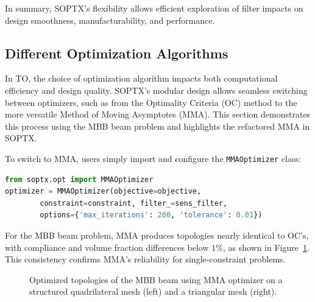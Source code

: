 \documentclass[mathpazo]{cicp}
\begin{document}
In summary, SOPTX's flexibility allows efficient exploration of filter impacts on design smoothness, manufacturability, and performance.

\subsection{Different Optimization Algorithms}
In TO, the choice of optimization algorithm impacts both computational efficiency and design quality. SOPTX’s modular design allows seamless switching between optimizers, such as from the Optimality Criteria (OC) method to the more versatile Method of Moving Asymptotes (MMA). This section demonstrates this process using the MBB beam problem and highlights the refactored MMA in SOPTX.

To switch to MMA, users simply import and configure the \texttt{MMAOptimizer} class:
\begin{lstlisting}[language=python]
from soptx.opt import MMAOptimizer
optimizer = MMAOptimizer(objective=objective, 
		constraint=constraint, filter_=sens_filter,
		options={'max_iterations': 200, 'tolerance': 0.01})
\end{lstlisting}

For the MBB beam problem, MMA produces topologies nearly identical to OC’s, with compliance and volume fraction differences below $1\%$, as shown in Figure~\ref{fig:mbb_mma_all}. This consistency confirms MMA’s reliability for single-constraint problems.
\begin{figure}[htb]
	\centering
	\caption{Optimized topologies of the MBB beam using MMA optimizer on a structured quadrilateral mesh (left) and a triangular mesh (right).}
	\label{fig:mbb_mma_all}
\end{figure}
\end{document}
